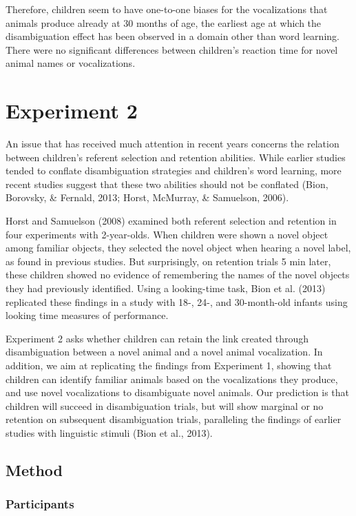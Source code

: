 \documentclass[english,floatsintext,man]{apa6}
\theoremstyle{definition}
\theoremstyle{definition}
\theoremstyle{definition}
\theoremstyle{remark}
\begin{document}
Therefore, children seem to have one-to-one biases for the vocalizations
that animals produce already at 30 months of age, the earliest age at
which the disambiguation effect has been observed in a domain other than
word learning. There were no significant differences between children's
reaction time for novel animal names or vocalizations.

\section{Experiment 2}\label{experiment-2}

An issue that has received much attention in recent years concerns the
relation between children's referent selection and retention abilities.
While earlier studies tended to conflate disambiguation strategies and
children's word learning, more recent studies suggest that these two
abilities should not be conflated (Bion, Borovsky, \& Fernald, 2013;
Horst, McMurray, \& Samuelson, 2006).

Horst and Samuelson (2008) examined both referent selection and
retention in four experiments with 2-year-olds. When children were shown
a novel object among familiar objects, they selected the novel object
when hearing a novel label, as found in previous studies. But
surprisingly, on retention trials 5 min later, these children showed no
evidence of remembering the names of the novel objects they had
previously identified. Using a looking-time task, Bion et al. (2013)
replicated these findings in a study with 18-, 24-, and 30-month-old
infants using looking time measures of performance.

Experiment 2 asks whether children can retain the link created through
disambiguation between a novel animal and a novel animal vocalization.
In addition, we aim at replicating the findings from Experiment 1,
showing that children can identify familiar animals based on the
vocalizations they produce, and use novel vocalizations to disambiguate
novel animals. Our prediction is that children will succeed in
disambiguation trials, but will show marginal or no retention on
subsequent disambiguation trials, paralleling the findings of earlier
studies with linguistic stimuli (Bion et al., 2013).

\subsection{Method}\label{method-1}

\subsubsection{Participants}\label{participants-1}
\end{document}
